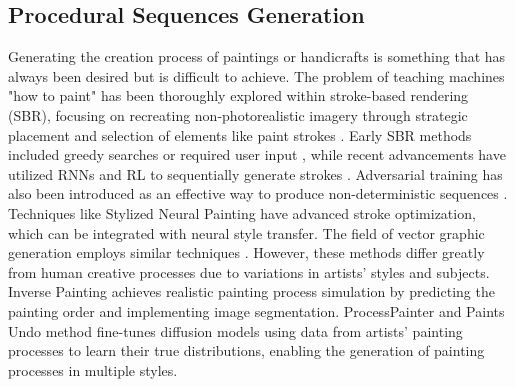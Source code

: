 \subsection{Procedural Sequences Generation}

Generating the creation process of paintings or handicrafts is something that has always been desired but is difficult to achieve. The problem of teaching machines "how to paint" has been thoroughly explored within stroke-based rendering (SBR), focusing on recreating non-photorealistic imagery through strategic placement and selection of elements like paint strokes \cite{hertzmann2003survey}. Early SBR methods included greedy searches or required user input \cite{haeberli1990paint,litwinowicz1997processing}, while recent advancements have utilized RNNs and RL to sequentially generate strokes \cite{ha2017neural,zhou2018learning,xie2013artist}. Adversarial training has also been introduced as an effective way to produce non-deterministic sequences \cite{nakano2019neural}. Techniques like Stylized Neural Painting \cite{ kotovenko2021rethinking} have advanced stroke optimization, which can be integrated with neural style transfer. The field of vector graphic generation employs similar techniques \cite{clipdraw, clipvg, cliptexture, clipfont}. However, these methods differ greatly from human creative processes due to variations in artists' styles and subjects. Inverse Painting \cite{inverse} achieves realistic painting process simulation by predicting the painting order and implementing image segmentation. ProcessPainter \cite{processpainter} and Paints Undo \cite{paintsundo} method fine-tunes diffusion models using data from artists' painting processes to learn their true distributions, enabling the generation of painting processes in multiple styles. 

